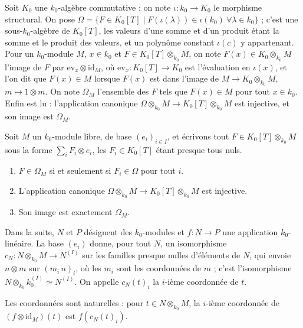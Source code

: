 \begin{definition}
Soit $K_0$ une $k_0$-algèbre commutative ; on note $\iota : k_0 \to K_0$ le morphisme structural. On pose $\Omega = \{F \in K_0[T] \mid F(\iota(\lambda)) \in \iota(k_0) \ \forall \lambda \in k_0\}$ ; c'est une sous-$k_0$-algèbre de $K_0[T]$, les valeurs d'une somme et d'un produit étant la somme et le produit des valeurs, et un polynôme constant $\iota(c)$ y appartenant. Pour un $k_0$-module $M$, $x \in k_0$ et $F \in K_0[T] \otimes_{k_0} M$, on note $F(x) \in K_0 \otimes_{k_0} M$ l'image de $F$ par $\mathrm{ev}_x \otimes \mathrm{id}_M$, où $\mathrm{ev}_x : K_0[T] \to K_0$ est l'évaluation en $\iota(x)$, et l'on dit que $F(x) \in M$ lorsque $F(x)$ est dans l'image de $M \to K_0 \otimes_{k_0} M$, $m \mapsto 1 \otimes m$. On note $\Omega_M$ l'ensemble des $F$ tels que $F(x) \in M$ pour tout $x \in k_0$. Enfin  est lu : l'application canonique $\Omega \otimes_{k_0} M \to K_0[T] \otimes_{k_0} M$ est injective, et son image est $\Omega_M$.
\end{definition}

\begin{enonce}
Soit $M$ un $k_0$-module libre, de base $(e_i)_{i \in I}$, et écrivons tout $F \in K_0[T] \otimes_{k_0} M$ sous la forme $\sum_i F_i \otimes e_i$, les $F_i \in K_0[T]$ étant presque tous nuls.
\begin{enumerate}
\item $F \in \Omega_M$ si et seulement si $F_i \in \Omega$ pour tout $i$.
\item L'application canonique $\Omega \otimes_{k_0} M \to K_0[T] \otimes_{k_0} M$ est injective.
\item Son image est exactement $\Omega_M$.
\end{enumerate}
\end{enonce}

Dans la suite, $N$ et $P$ désignent des $k_0$-modules et $f : N \to P$ une application $k_0$-linéaire. La base $(e_i)$ donne, pour tout $N$, un isomorphisme $c_N : N \otimes_{k_0} M \to N^{(I)}$ sur les familles presque nulles d'éléments de $N$, qui envoie $n \otimes m$ sur $(m_i\, n)_i$, où les $m_i$ sont les coordonnées de $m$ ; c'est l'isomorphisme $N \otimes_{k_0} k_0^{(I)} \simeq N^{(I)}$. On appelle $c_N(t)_i$ la $i$-ième coordonnée de $t$.

\begin{lemme}\label{lem:153-nat}
Les coordonnées sont naturelles : pour $t \in N \otimes_{k_0} M$, la $i$-ième coordonnée de $(f \otimes \mathrm{id}_M)(t)$ est $f(c_N(t)_i)$.
\end{lemme}

